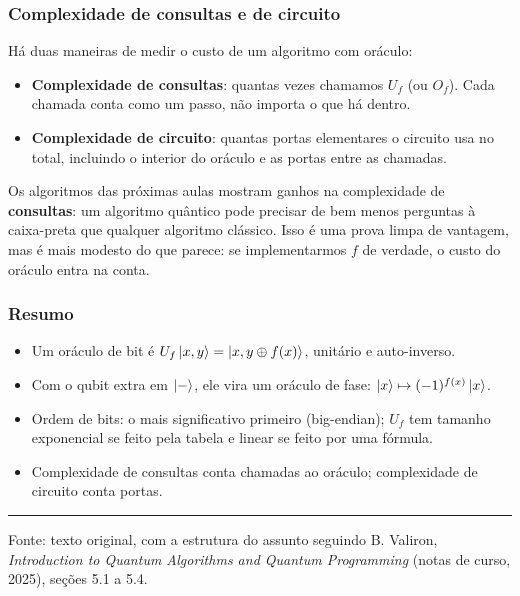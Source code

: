 \subsubsection{Complexidade de consultas e de circuito}\label{complexidade-de-consultas-e-de-circuito}

Há duas maneiras de medir o custo de um algoritmo com oráculo:

\begin{itemize}
\tightlist
\item
  \textbf{Complexidade de consultas}: quantas vezes chamamos \(U_f\) (ou \(O_f\)). Cada chamada conta como um passo, não importa o que há dentro.
\item
  \textbf{Complexidade de circuito}: quantas portas elementares o circuito usa no total, incluindo o interior do oráculo e as portas entre as chamadas.
\end{itemize}

Os algoritmos das próximas aulas mostram ganhos na complexidade de \textbf{consultas}: um algoritmo quântico pode precisar de bem menos perguntas à caixa-preta que qualquer algoritmo clássico. Isso é uma prova limpa de vantagem, mas é mais modesto do que parece: se implementarmos \(f\) de verdade, o custo do oráculo entra na conta.

\subsubsection{Resumo}\label{resumo}

\begin{itemize}
\tightlist
\item
  Um oráculo de bit é \(U_f\left|{x,y}\right>=\left|{x,y\oplus f(x)}\right>\), unitário e auto-inverso.
\item
  Com o qubit extra em \(\left|{-}\right>\), ele vira um oráculo de fase: \(\left|{x}\right>\mapsto(-1)^{f(x)}\left|{x}\right>\).
\item
  Ordem de bits: o mais significativo primeiro (big-endian); \(U_f\) tem tamanho exponencial se feito pela tabela e linear se feito por uma fórmula.
\item
  Complexidade de consultas conta chamadas ao oráculo; complexidade de circuito conta portas.
\end{itemize}

\begin{center}\rule{0.5\linewidth}{0.5pt}\end{center}

Fonte: texto original, com a estrutura do assunto seguindo B. Valiron, \emph{Introduction to Quantum Algorithms and Quantum Programming} (notas de curso, 2025), seções 5.1 a 5.4.

